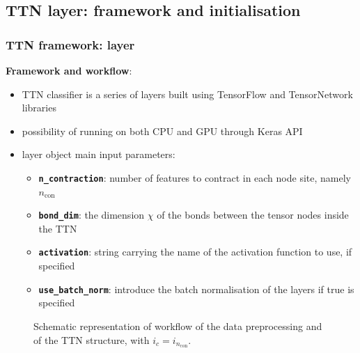\documentclass[xcolor=table,8pt]{beamer}
\begin{document}
    
    \subsection{TTN layer: framework and initialisation}
    \begin{frame}[t]
        \frametitle{TTN framework: layer}
    
        \textbf{Framework and workflow}:
        \begin{itemize}
            \item TTN classifier is a series of layers built using \alert{TensorFlow and TensorNetwork libraries}
            \item possibility of running on \alert{both CPU and GPU} through Keras API
            \item layer object main input parameters:
            \begin{itemize}
                \item \alert{\texttt{\bfseries n\_contraction}}: number of features to contract in each node site, namely \( n_{\text{con}} \)
                \item \alert{\texttt{\bfseries bond\_dim}}: the dimension \( \chi \) of the bonds between the tensor nodes inside the TTN
                \item \alert{\texttt{\bfseries activation}}: string carrying the name of the activation function to use, if specified
                \item \alert{\texttt{\bfseries use\_batch\_norm}}: introduce the batch normalisation of the layers if true is specified
            \end{itemize}
        \end{itemize}
        
        \vspace{10pt}
        \begin{figure}[!h]
            
            \caption{Schematic representation of workflow of the data preprocessing and of the TTN structure, with \( i_{c} = i_{n_{\text{con}}} \).}
            \label{fig:code_layer_workflow}
        \end{figure}

    \end{frame}
    
\end{document}
